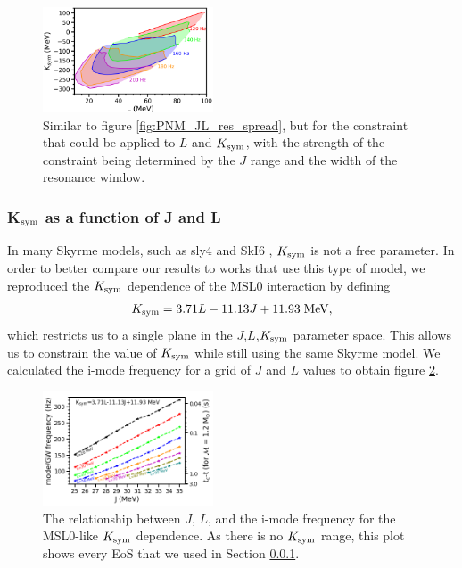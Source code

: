 \documentclass[fleqn,usenatbib]{mnras}
\begin{document}
\begin{figure}
\centering
\includegraphics[width=0.45\textwidth,angle=0]{PNM_LK_Jdfspread.png}
\caption{Similar to figure \ref{fig:PNM_JL_res_spread}, but for the constraint that could be applied to $L$ and $K_{\rm sym}$, with the strength of the constraint being determined by the $J$ range and the width of the resonance window.}
\label{fig:PNM_LK_res_spread}
\end{figure}











\subsubsection{K$_{\rm sym}$ as a function of J and L}\label{subsec4_1_3}
\hspace{\parindent}In many Skyrme models, such as sly4 \citep{chabanat1998skyrme} and SkI6 \citep{reinhard1995nuclear,nazarewicz1996structure}, $K_{\rm sym}$ is not a free parameter. In order to better compare our results to works that use this type of model, we reproduced the $K_{\rm sym}$ dependence of the MSL0 interaction \citep{chen2010density} by defining \citep{newton2020nuclear}
\begin{align}
K_{\rm sym}=3.71L-11.13J+11.93\; \rm{MeV},
\end{align}
\noindent which restricts us to a single plane in the $J$,$L$,$K_{\rm sym}$ parameter space. This allows us to constrain the value of $K_{\rm sym}$ while still using the same Skyrme model. We calculated the i-mode frequency for a grid of $J$ and $L$ values to obtain figure \ref{fig:MSL0_J_L_f_tc}.

\begin{figure}
\centering
\includegraphics[width=0.45\textwidth,angle=0]{MSL0_J_L_f_tc}
\caption{The relationship between $J$, $L$, and the i-mode frequency for the MSL0-like $K_{\rm sym}$ dependence. As there is no $K_{\rm sym}$ range, this plot shows every EoS that we used in Section \ref{subsec4_1_3}.}
\label{fig:MSL0_J_L_f_tc}
\end{figure}
\end{document}
